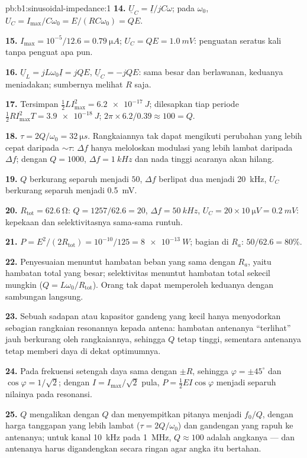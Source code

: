 \begin{solution}{pb:b1:sinusoidal-impedance:1}
\textbf{14.} $\underline U_C = \underline I/jC\omega$; pada $\omega_0$,
$U_C = I_{\max}/C\omega_0 = E/(RC\omega_0) = QE$.

\textbf{15.} $I_{\max} = 10^{-5}/12.6 = \qty{0.79}{\micro A}$; $U_C = QE =
\qty{1.0}{mV}$: penguatan  seratus kali tanpa penguat apa pun.

\textbf{16.} $\underline U_L = jL\omega_0\underline I = jQE$, $\underline U_C
= -jQE$: sama besar dan berlawanan, keduanya meniadakan; sumbernya melihat $R$ saja.

\textbf{17.} Tersimpan $\tfrac12 LI_{\max}^2 = \qty{6.2e-17}{J}$; dilesapkan
tiap periode $\tfrac12 RI_{\max}^2T = \qty{3.9e-18}{J}$; $2\pi \times 6.2/0.39
\approx 100 = Q$.

\textbf{18.} $\tau = 2Q/\omega_0 = \qty{32}{\micro s}$. Rangkaiannya tak
dapat mengikuti perubahan yang lebih cepat daripada $\sim\tau$:  $\Delta f$ hanya meloloskan modulasi yang lebih lambat daripada
$\Delta f$; dengan $Q = 1000$, $\Delta f =
\qty{1}{kHz}$ dan nada tinggi acaranya akan hilang.

\textbf{19.} $Q$ berkurang separuh menjadi $50$, $\Delta f$ berlipat dua
menjadi \qty{20}{kHz}, $U_C$ berkurang separuh menjadi \qty{0.5}{mV}.

\textbf{20.} $R_{\text{tot}} = \qty{62.6}{\ohm}$: $Q = 1257/62.6 = 20$,
$\Delta f = \qty{50}{kHz}$, $U_C = 20 \times \qty{10}{\micro V} = \qty{0.2}{mV}$:
kepekaan dan selektivitasnya sama-sama runtuh.

\textbf{21.} $P = E^2/(2R_{\text{tot}}) = 10^{-10}/125 = \qty{8e-13}{W}$;
bagian di $R_a$: $50/62.6 = 80\%$.

\textbf{22.} Penyesuaian menuntut hambatan beban yang sama dengan $R_a$,
yaitu hambatan total yang besar; selektivitas menuntut hambatan total
sekecil mungkin ($Q = L\omega_0/R_{\text{tot}}$). Orang tak dapat
memperoleh keduanya dengan sambungan langsung.

\textbf{23.} Sebuah sadapan atau kapasitor gandeng yang kecil hanya
menyodorkan sebagian rangkaian resonannya kepada antena: hambatan
antenanya ``terlihat'' jauh berkurang oleh rangkaiannya, sehingga $Q$
tetap tinggi, sementara antenanya tetap memberi daya di dekat optimumnya.

\textbf{24.} Pada frekuensi setengah daya  sama dengan
$\pm R$, sehingga $\varphi = \pm45^\circ$ dan $\cos\varphi = 1/\sqrt2$;
dengan $I =
I_{\max}/\sqrt2$ pula, $P = \tfrac12 EI\cos\varphi$ menjadi separuh
nilainya pada resonansi.

\textbf{25.} $Q$ mengalikan  dengan $Q$ dan menyempitkan pitanya
menjadi $f_0/Q$, dengan harga tanggapan yang lebih lambat
($\tau = 2Q/\omega_0$) dan gandengan yang rapuh ke antenanya; untuk kanal
\qty{10}{kHz} pada \qty{1}{MHz}, $Q \approx 100$ adalah angkanya --- dan
antenanya harus digandengkan secara ringan agar angka itu bertahan.
\end{solution}
